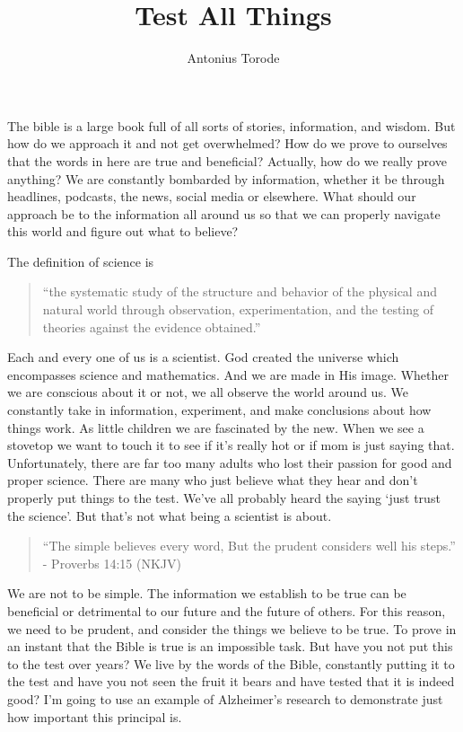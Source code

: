 \documentclass[10pt]{article}
\title{Test All Things}
\author{Antonius Torode}
\begin{document}
\maketitle
\thispagestyle{fancy}

\begin{multicols}{2}

The bible is a large book full of all sorts of stories, information, and wisdom. But how do we approach it and not get overwhelmed? How do we prove to ourselves that the words in here are true and beneficial? Actually, how do we really prove anything? We are constantly bombarded by information, whether it be through headlines, podcasts, the news, social media or elsewhere. What should our approach be to the information all around us so that we can properly navigate this world and figure out what to believe?

The definition of science is

\begin{quotation}
``the systematic study of the structure and behavior of the physical and natural world through observation, experimentation, and the testing of theories against the evidence obtained.''
\end{quotation}

Each and every one of us is a scientist. God created the universe which encompasses science and mathematics. And we are made in His image. Whether we are conscious about it or not, we all observe the world around us. We constantly take in information, experiment, and make conclusions about how things work. As little children we are fascinated by the new. When we see a stovetop we want to touch it to see if it's really hot or if mom is just saying that. Unfortunately, there are far too many adults who lost their passion for good and proper science. There are many who just believe what they hear and don't properly put things to the test. We've all probably heard the saying `just trust the science'. But that's not what being a scientist is about.

\begin{quotation}
``The simple believes every word, But the prudent considers well his steps.'' - Proverbs 14:15 (NKJV)
\end{quotation}

We are not to be simple. The information we establish to be true can be beneficial or detrimental to our future and the future of others. For this reason, we need to be prudent, and consider the things we believe to be true. To prove in an instant that the Bible is true is an impossible task. But have you not put this to the test over years? We live by the words of the Bible, constantly putting it to the test and have you not seen the fruit it bears and have tested that it is indeed good? I'm going to use an example of Alzheimer's research to demonstrate just how important this principal is.


\end{multicols}
\end{document}
